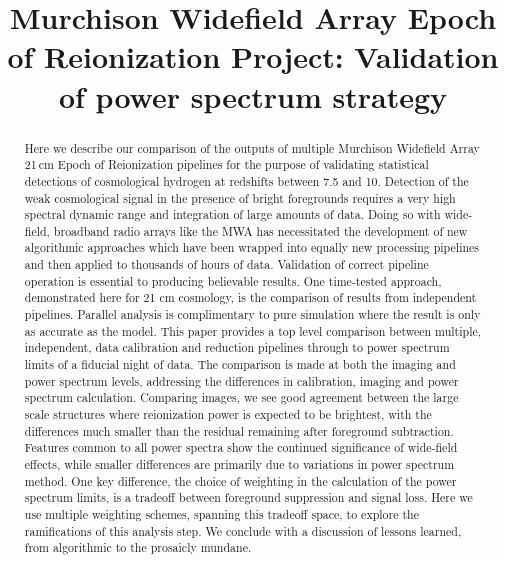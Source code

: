\documentclass[twolcolumn,iop]{emulateapj}
\begin{document}

\title{Murchison Widefield Array Epoch of Reionization Project: Validation of power spectrum strategy}






\begin{abstract}
Here we describe our comparison of the outputs of multiple Murchison Widefield Array 21\,cm Epoch of Reionization pipelines for the purpose of validating statistical detections of cosmological hydrogen at redshifts between 7.5 and 10. Detection of the weak cosmological signal in the presence of bright foregrounds requires a very high spectral dynamic range and integration of large amounts of data. Doing so with wide-field, broadband radio arrays like the MWA has necessitated the development of new algorithmic approaches which have been wrapped into equally new processing pipelines and then applied to thousands of hours of data. Validation of  correct pipeline operation is essential to producing believable results. One time-tested approach, demonstrated here for 21 cm cosmology, is the comparison of results from independent pipelines. Parallel analysis is complimentary to pure simulation where the result is only as accurate as the model.  This paper provides a top level comparison between multiple, independent, data calibration and reduction pipelines through to power spectrum limits of a fiducial night of data.  The comparison is made at both the imaging and power spectrum levels, addressing the differences in calibration, imaging and power spectrum calculation. Comparing images, we see good agreement between the large scale structures where reionization power is expected to be brightest, with the differences much smaller than the residual remaining after foreground subtraction. Features common to all power spectra show the continued significance of wide-field effects, while smaller differences are primarily due to variations in power spectrum method. One key difference, the choice of weighting in the calculation of the power spectrum limits, is a tradeoff between foreground suppression and signal loss. Here we use multiple weighting schemes, spanning this tradeoff space, to explore the ramifications of this analysis step. We conclude with a discussion of lessons learned, from algorithmic to the prosaicly mundane.

\end{abstract}
\end{document}
